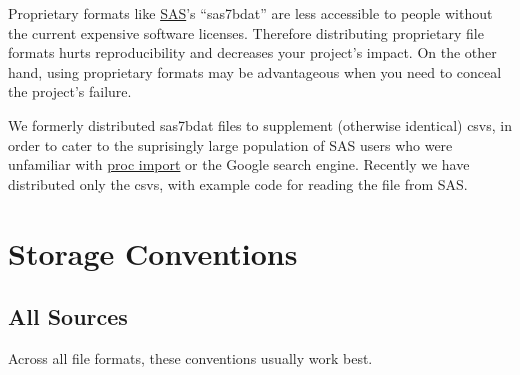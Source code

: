 \documentclass[
]{book}
\begin{document}
Proprietary formats like \href{https://en.wikipedia.org/wiki/SAS_(software)}{SAS}'s ``sas7bdat'' are less accessible to people without the current expensive software licenses. Therefore distributing proprietary file formats hurts reproducibility and decreases your project's impact. On the other hand, using proprietary formats may be advantageous when you need to conceal the project's failure.

We formerly distributed sas7bdat files to supplement (otherwise identical) csvs, in order to cater to the suprisingly large population of SAS users who were unfamiliar with \href{https://documentation.sas.com/?docsetId=proc\&docsetTarget=n18jyszn33umngn14czw2qfw7thc.htm\&docsetVersion=9.4\&locale=en}{proc import} or the Google search engine. Recently we have distributed only the csvs, with example code for reading the file from SAS.

\hypertarget{data-conventions}{%
\section{Storage Conventions}\label{data-conventions}}

\hypertarget{data-conventions-all}{%
\subsection{All Sources}\label{data-conventions-all}}

Across all file formats, these conventions usually work best.
\end{document}

